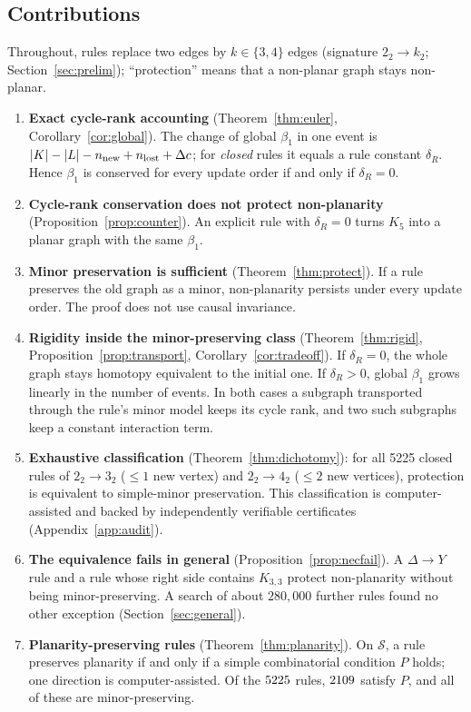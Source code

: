 \documentclass[10pt]{article}
\theoremstyle{definition}
\theoremstyle{plain}
\theoremstyle{remark}
\newcommand{\Betti}{\beta_1}
\begin{document}
\subsection{Contributions}
Throughout, rules replace two edges by $k\in\{3,4\}$ edges (signature $2_2\to k_2$; Section~\ref{sec:prelim}); ``protection'' means that a non-planar graph stays non-planar.
\begin{enumerate}
\item \textbf{Exact cycle-rank accounting} (Theorem~\ref{thm:euler}, Corollary~\ref{cor:global}). The change of global $\Betti$ in one event is $|K|-|L|-n_{\rm new}+n_{\rm lost}+\Delta c$; for \emph{closed} rules it equals a rule constant $\delta_R$. Hence $\Betti$ is conserved for every update order if and only if $\delta_R=0$.
\item \textbf{Cycle-rank conservation does not protect non-planarity} (Proposition~\ref{prop:counter}). An explicit rule with $\delta_R=0$ turns $K_5$ into a planar graph with the same $\Betti$.
\item \textbf{Minor preservation is sufficient} (Theorem~\ref{thm:protect}). If a rule preserves the old graph as a minor, non-planarity persists under every update order. The proof does not use causal invariance.
\item \textbf{Rigidity inside the minor-preserving class} (Theorem~\ref{thm:rigid}, Proposition~\ref{prop:transport}, Corollary~\ref{cor:tradeoff}). If $\delta_R=0$, the whole graph stays homotopy equivalent to the initial one. If $\delta_R>0$, global $\Betti$ grows linearly in the number of events. In both cases a subgraph transported through the rule's minor model keeps its cycle rank, and two such subgraphs keep a constant interaction term.
\item \textbf{Exhaustive classification} (Theorem~\ref{thm:dichotomy}): for all 5225 closed rules of $2_2\to3_2$ ($\le1$ new vertex) and $2_2\to4_2$ ($\le2$ new vertices), protection is equivalent to simple-minor preservation. This classification is computer-assisted and backed by independently verifiable certificates (Appendix~\ref{app:audit}).
\item \textbf{The equivalence fails in general} (Proposition~\ref{prop:necfail}). A $\Delta\to Y$ rule and a rule whose right side contains $K_{3,3}$ protect non-planarity without being minor-preserving. A search of about $280{,}000$ further rules found no other exception (Section~\ref{sec:general}).
\item \textbf{Planarity-preserving rules} (Theorem~\ref{thm:planarity}). On $\mathcal S$, a rule preserves planarity if and only if a simple combinatorial condition $P$ holds; one direction is computer-assisted. Of the $5225$ rules, $2109$ satisfy $P$, and all of these are minor-preserving.

\end{enumerate}
\end{document}
